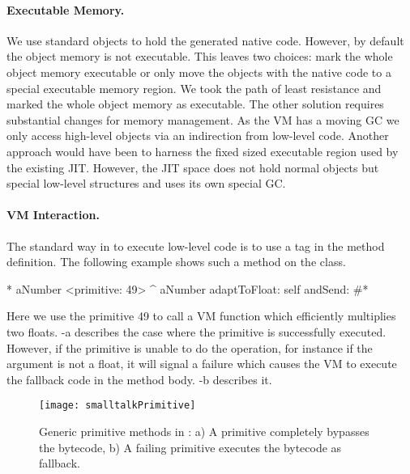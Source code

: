 \paragraph{Executable Memory.}
 
We use standard \ST objects to hold the generated native code.
However, by default the object memory is not executable.
This leaves two choices: mark the whole object memory executable or only move the objects with the native code to a special executable memory region.
We took the path of least resistance and marked the whole object memory as executable.
The other solution requires substantial changes for memory management. As the VM has a moving GC we only access high-level \ST objects via an indirection from low-level code.
Another approach would have been to harness the fixed sized executable region used by the existing JIT.
However, the JIT space does not hold normal \ST objects but special low-level structures and uses its own special GC. 

\paragraph{VM Interaction.}


The standard way in \ST to execute low-level code is to use a tag in the method definition. The following example shows such a method on the  class.
%
\begin{stcode}[label={lst:basic-primitive}]{5}
* aNumber 
	<primitive: 49>
	^ aNumber adaptToFloat: self andSend: #*
\end{stcode}
%
Here we use the primitive 49 to call a VM function which efficiently multiplies two floats. 
-a describes the case where the primitive is successfully executed.
However, if the primitive is unable to do the operation, for instance if the argument  is not a float, it will signal a failure which causes the VM to execute the fallback \ST code in the method body.  
-b describes it. 

\begin{figure}[ht]
	\centering
	\texttt{[image: smalltalkPrimitive]}
	\caption[\PH Primitive]{Generic primitive methods in \PH: a) A primitive completely bypasses the bytecode, b) A failing primitive executes the bytecode as fallback.}
\end{figure}


